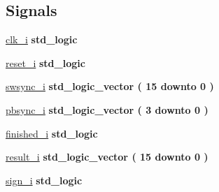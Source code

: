 \subsection*{Signals}
 \begin{DoxyCompactItemize}
\item 
\hyperlink{classtb__calc__ctrl_1_1sim_a51bcb92d1464ea7874528ced3e160ff1}{clk\+\_\+i} {\bfseries \textcolor{comment}{std\+\_\+logic}\textcolor{vhdlchar}{ }} 
\item 
\hyperlink{classtb__calc__ctrl_1_1sim_acdf401306b90eed21a930a1cdc85e912}{reset\+\_\+i} {\bfseries \textcolor{comment}{std\+\_\+logic}\textcolor{vhdlchar}{ }} 
\item 
\hyperlink{classtb__calc__ctrl_1_1sim_a0e9b3de9ba7928cacb930384f44e32e2}{swsync\+\_\+i} {\bfseries \textcolor{comment}{std\+\_\+logic\+\_\+vector}\textcolor{vhdlchar}{ }\textcolor{vhdlchar}{(}\textcolor{vhdlchar}{ }\textcolor{vhdlchar}{ } \textcolor{vhdldigit}{15} \textcolor{vhdlchar}{ }\textcolor{keywordflow}{downto}\textcolor{vhdlchar}{ }\textcolor{vhdlchar}{ } \textcolor{vhdldigit}{0} \textcolor{vhdlchar}{ }\textcolor{vhdlchar}{)}\textcolor{vhdlchar}{ }} 
\item 
\hyperlink{classtb__calc__ctrl_1_1sim_ae322facde1cc2d6a0e2f021322cc74f3}{pbsync\+\_\+i} {\bfseries \textcolor{comment}{std\+\_\+logic\+\_\+vector}\textcolor{vhdlchar}{ }\textcolor{vhdlchar}{(}\textcolor{vhdlchar}{ }\textcolor{vhdlchar}{ } \textcolor{vhdldigit}{3} \textcolor{vhdlchar}{ }\textcolor{keywordflow}{downto}\textcolor{vhdlchar}{ }\textcolor{vhdlchar}{ } \textcolor{vhdldigit}{0} \textcolor{vhdlchar}{ }\textcolor{vhdlchar}{)}\textcolor{vhdlchar}{ }} 
\item 
\hyperlink{classtb__calc__ctrl_1_1sim_a75ddb57fe4768f9d6eb91482cd3ca97e}{finished\+\_\+i} {\bfseries \textcolor{comment}{std\+\_\+logic}\textcolor{vhdlchar}{ }} 
\item 
\hyperlink{classtb__calc__ctrl_1_1sim_a351e079e4151f768cc68407469813ff5}{result\+\_\+i} {\bfseries \textcolor{comment}{std\+\_\+logic\+\_\+vector}\textcolor{vhdlchar}{ }\textcolor{vhdlchar}{(}\textcolor{vhdlchar}{ }\textcolor{vhdlchar}{ } \textcolor{vhdldigit}{15} \textcolor{vhdlchar}{ }\textcolor{keywordflow}{downto}\textcolor{vhdlchar}{ }\textcolor{vhdlchar}{ } \textcolor{vhdldigit}{0} \textcolor{vhdlchar}{ }\textcolor{vhdlchar}{)}\textcolor{vhdlchar}{ }} 
\item 
\hyperlink{classtb__calc__ctrl_1_1sim_a7d91890e872df25c92747142384552c1}{sign\+\_\+i} {\bfseries \textcolor{comment}{std\+\_\+logic}\textcolor{vhdlchar}{ }} 

\end{DoxyCompactItemize}
